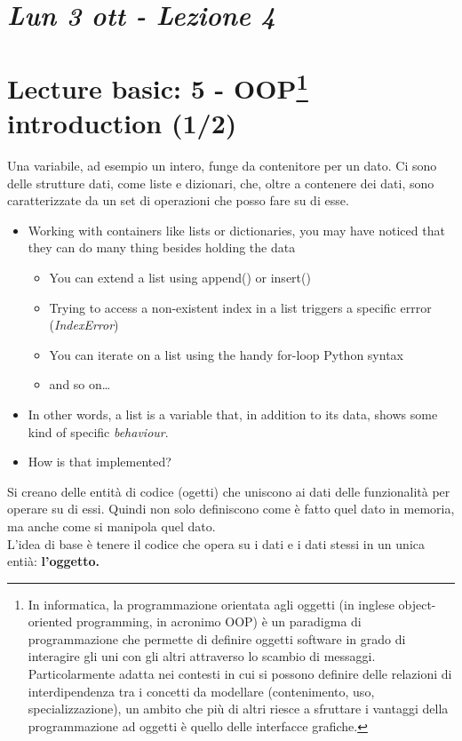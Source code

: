 \newpage
\section{\textit{Lun 3 ott - Lezione 4}}

\section{Lecture basic: 5 - OOP\footnote{In informatica, la programmazione orientata agli oggetti (in inglese object-oriented programming, in acronimo OOP) è un paradigma di programmazione che permette di definire oggetti software in grado di interagire gli uni con gli altri attraverso lo scambio di messaggi. Particolarmente adatta nei contesti in cui si possono definire delle relazioni di interdipendenza tra i concetti da modellare (contenimento, uso, specializzazione), un ambito che più di altri riesce a sfruttare i vantaggi della programmazione ad oggetti è quello delle interfacce grafiche.} introduction (1/2)}


Una variabile, ad esempio un intero, funge da contenitore per un dato. Ci sono delle strutture dati, come liste e dizionari, che, oltre a contenere dei dati, sono caratterizzate da un set di operazioni che posso fare su di esse.\\

  \begin{itemize}
    \item Working with containers like lists or dictionaries, you may have noticed
          that they can do many thing besides holding the data
    \medskip
    \begin{itemize}
      \item You can extend a list using append() or insert()
      \item Trying to access a non-existent index in a list triggers a specific errror (\emph{IndexError})
      \item You can iterate on a list using the handy for-loop Python syntax
      \item and so on\dots
     \end{itemize}
     \medskip
     \item In other words, a list is a variable that, in addition to its data,
           shows some kind of specific \emph{behaviour}.
     \medskip
     \item How is that implemented?
  \end{itemize}


Si creano delle entità di codice (ogetti) che uniscono ai dati delle funzionalità per operare su di essi. Quindi non solo definiscono come è fatto quel dato in memoria, ma anche come si manipola quel dato.\\
L'idea di base è tenere il codice che opera su i dati e i dati stessi in un unica entià: \textbf{l'oggetto.}\\


